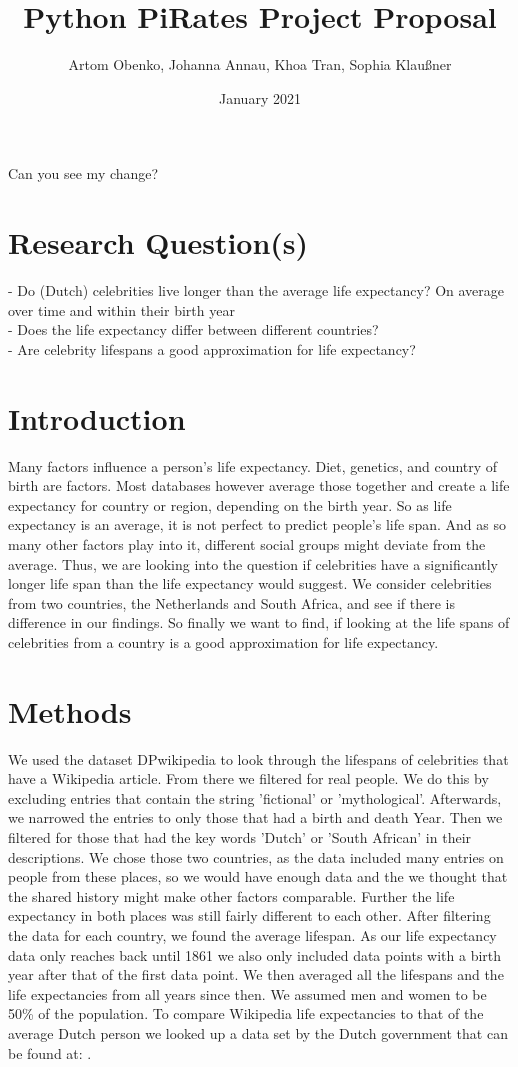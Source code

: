 \documentclass{article}
\title{Python PiRates Project Proposal}
\author{Artom Obenko, Johanna Annau, Khoa Tran, Sophia Klaußner}
\date{January 2021}
\begin{document}
	
\maketitle
	Can you see my change?
\section{Research Question(s)}
- Do (Dutch) celebrities live longer than the average life expectancy? On average over time and within their birth year\\
- Does the life expectancy differ between different countries?\\
- Are celebrity lifespans a good approximation for life expectancy?\\
	
\section{Introduction}
Many factors influence a person's life expectancy. Diet, genetics, and country of birth are factors. Most databases however average those together and create a life expectancy for country or region, depending on the birth year.
So as life expectancy is an average, it is not perfect to predict people's life span. And as so many other factors play into it, different social groups might deviate from the average. Thus, we are looking into the question if celebrities have a significantly longer life span than the life expectancy would suggest. We consider celebrities from two countries, the Netherlands and South Africa, and see if there is difference in our findings. So finally we want to find, if looking at the life spans of celebrities from a country is a good approximation for life expectancy.

\section{Methods}
We used the dataset DPwikipedia to look through the lifespans of celebrities that have a Wikipedia article. From there we filtered for real people. We do this by excluding entries that contain the string 'fictional' or 'mythological'. Afterwards, we narrowed the entries to only those that had a birth and death Year. Then we filtered for those that had the key words 'Dutch' or 'South African' in their descriptions. We chose those two countries, as the data included many entries on people from these places, so we would have enough data and the we thought that the shared history might make other factors comparable. Further the life expectancy in both places was still fairly different to each other. After filtering the data for each country, we found the average lifespan. As our life expectancy data only reaches back until 1861 we also only included data points with a birth year after that of the first data point. We then averaged all the lifespans and the life expectancies from all years since then. We assumed men and women to be 50\% of the population. To compare Wikipedia life expectancies to that of the average Dutch person we looked up a data set by the Dutch government that can be found at: \cite{Levensverwachting}. 
\end{document}
